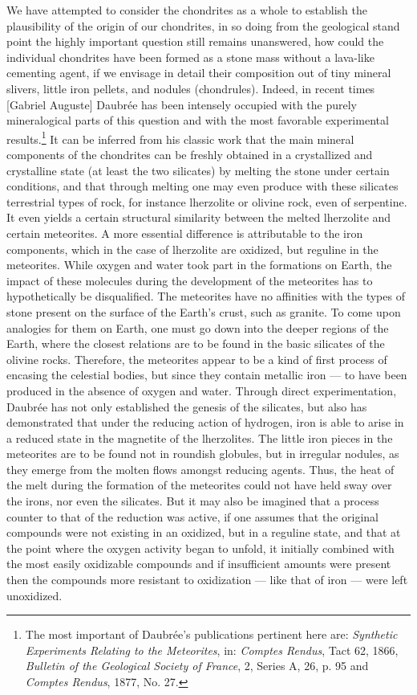 \documentclass[a4paper, 12pt, oneside]{article}
\begin{document}
We have attempted to consider the chondrites as a whole to establish the plausibility of the origin of our chondrites, in so doing from the geological stand point the highly important question still remains unanswered, how could the individual chondrites have been formed as a stone mass without a lava-like cementing agent, if we envisage in detail their composition out of tiny mineral slivers, little iron pellets, and nodules (chondrules). Indeed, in recent times [Gabriel Auguste] Daubrée has been intensely occupied with the purely mineralogical parts of this question and with the most favorable experimental results.\footnote{The most important of Daubrée's publications pertinent here are: \emph{Synthetic Experiments Relating to the Meteorites}, in: \emph{Comptes Rendus}, Tact 62, 1866, \emph{Bulletin of the Geological Society of France}, 2, Series A, 26, p. 95 and \emph{Comptes Rendus}, 1877, No. 27.} It can be inferred from his classic work that the main mineral components of the chondrites can be freshly obtained in a crystallized and crystalline state (at least the two silicates) by melting the stone under certain conditions, and that through melting one may even produce with these silicates terrestrial types of rock, for instance lherzolite or olivine rock, even of serpentine. It even yields a certain structural similarity between the melted lherzolite and certain meteorites. A more essential difference is attributable to the iron components, which in the case of lherzolite are oxidized, but reguline in the meteorites. While oxygen and water took part in the formations on Earth, the impact of these molecules during the development of the meteorites has to hypothetically be disqualified. The meteorites have no affinities with the types of stone present on the surface of the Earth's crust, such as granite. To come upon analogies for them on Earth, one must go down into the deeper regions of the Earth, where the closest relations are to be found in the basic silicates of the olivine rocks. Therefore, the meteorites appear to be a kind of first process of encasing the celestial bodies, but since they contain metallic iron --- to have been produced in the absence of oxygen and water. Through direct experimentation, Daubrée has not only established the genesis of the silicates, but also has demonstrated that under the reducing action of hydrogen, iron is able to arise in a reduced state in the magnetite of the lherzolites. The little iron pieces in the meteorites are to be found not in roundish globules, but in irregular nodules, as they emerge from the molten flows amongst reducing agents. Thus, the heat of the melt during the formation of the meteorites could not have held sway over the irons, nor even the silicates. But it may also be imagined that a process counter to that of the reduction was active, if one assumes that the original compounds were not existing in an oxidized, but in a reguline state, and that at the point where the oxygen activity began to unfold, it initially combined with the most easily oxidizable compounds and if insufficient amounts were present then the compounds more resistant to oxidization --- like that of iron --- were left unoxidized.
\end{document}
